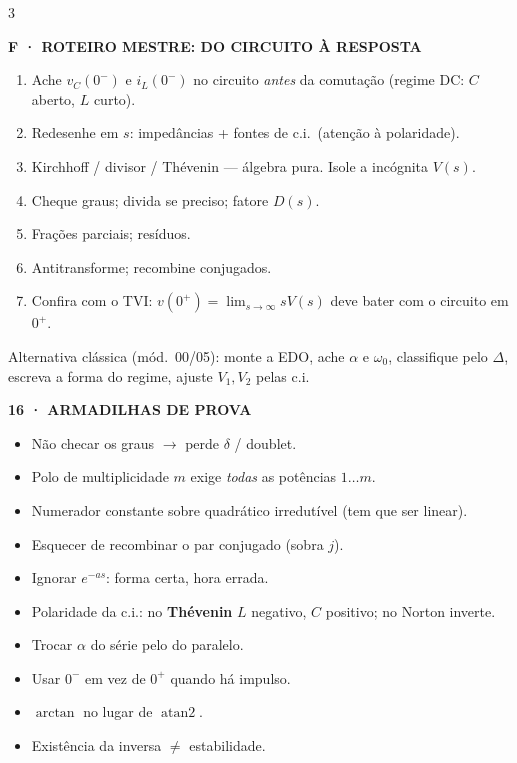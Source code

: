 \documentclass[10pt,a4paper]{article}
\newcommand{\sect}[1]{\vspace{1.2mm}{\color{acc}\rule{\linewidth}{0.9pt}}\vspace{-0.3mm}\par
  {\footnotesize\bfseries\color{acc}\MakeUppercase{#1}}\par\vspace{0.6mm}}
\newcommand{\note}[1]{{\color{gry}#1}\par\vspace{0.4mm}}
\newcommand{\ci}{0^{-}}
\newcommand{\cip}{0^{+}}
\begin{document}
\begin{multicols}{3}
\sect{F · Roteiro mestre: do circuito à resposta}
\begin{enumerate}[nosep]
\item Ache $v_C(\ci)$ e $i_L(\ci)$ no circuito \emph{antes} da comutação (regime DC: $C$ aberto, $L$ curto).
\item Redesenhe em $s$: impedâncias + fontes de c.i.\ (atenção à polaridade).
\item Kirchhoff / divisor / Thévenin — álgebra pura. Isole a incógnita $V(s)$.
\item Cheque graus; divida se preciso; fatore $D(s)$.
\item Frações parciais; resíduos.
\item Antitransforme; recombine conjugados.
\item Confira com o TVI: $v(\cip)=\lim_{s\to\infty}sV(s)$ deve bater com o circuito em $\cip$.
\end{enumerate}
\note{Alternativa clássica (mód.\ 00/05): monte a EDO, ache $\alpha$ e $\omega_0$, classifique pelo $\Delta$, escreva a forma do regime, ajuste $V_1,V_2$ pelas c.i.}

\sect{16 · Armadilhas de prova}
\begin{itemize}[nosep]
\item Não checar os graus $\to$ perde $\delta$ / doublet.
\item Polo de multiplicidade $m$ exige \emph{todas} as potências $1\ldots m$.
\item Numerador constante sobre quadrático irredutível (tem que ser linear).
\item Esquecer de recombinar o par conjugado (sobra $j$).
\item Ignorar $e^{-as}$: forma certa, hora errada.
\item Polaridade da c.i.: no \textbf{Thévenin} $L$ negativo, $C$ positivo; no Norton inverte.
\item Trocar $\alpha$ do série pelo do paralelo.
\item Usar $\ci$ em vez de $\cip$ quando há impulso.
\item $\arctan$ no lugar de $\operatorname{atan2}$.
\item Existência da inversa $\ne$ estabilidade.
\end{itemize}

\end{multicols}
\end{document}
